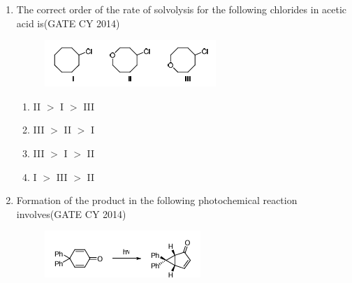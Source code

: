 \documentclass[a4paper,10pt]{exam}
\theoremstyle{remark}
\begin{document}
\begin{enumerate}
\begin{multicols}{4}
\begin{enumerate}
        \item III      $>$ II      $>$ I
        \item III      $>$ I      $>$ II
    \end{enumerate}
    \end{multicols}
\item The correct order of the rate of solvolysis for the following chlorides in acetic acid is\hfill{(GATE CY 2014)}
\begin{figure}[h]
    \centering
    \includegraphics[width=0.5\columnwidth]{figs/Q 20.png}
    \caption{}
    \label{fig:placeholder}
\end{figure}
\begin{multicols}{4}
    \begin{enumerate} 
        \item II      $>$ I      $>$ III
        \item III      $>$ II      $>$ I 
        \item III      $>$ I      $>$ II
        \item I      $>$ III      $>$ II
    \end{enumerate}
    \end{multicols}
\item Formation of the product in the following photochemical reaction involves\hfill{(GATE CY 2014)}
\begin{figure}[H]
    \centering
    \includegraphics[width=0.5\columnwidth]{figs/Q 21.png}
    \caption{}
    \label{fig:placeholder}
\end{figure}


\end{enumerate}
\end{document}
